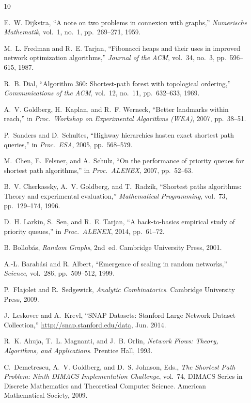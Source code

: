 \documentclass[conference]{IEEEtran}
\begin{document}

\begin{thebibliography}{10}

E.~W. Dijkstra,
``A note on two problems in connexion with graphs,''
\emph{Numerische Mathematik}, vol.~1, no.~1, pp.~269--271, 1959.

M.~L. Fredman and R.~E. Tarjan,
``Fibonacci heaps and their uses in improved network optimization
algorithms,''
\emph{Journal of the ACM}, vol.~34, no.~3, pp.~596--615, 1987.

R.~B. Dial,
``Algorithm 360: Shortest-path forest with topological ordering,''
\emph{Communications of the ACM}, vol.~12, no.~11, pp.~632--633, 1969.

A.~V. Goldberg, H.~Kaplan, and R.~F. Werneck,
``Better landmarks within reach,''
in \emph{Proc.\ Workshop on Experimental Algorithms (WEA)}, 2007,
pp.~38--51.

P.~Sanders and D.~Schultes,
``Highway hierarchies hasten exact shortest path queries,''
in \emph{Proc.\ ESA}, 2005, pp.~568--579.

M.~Chen, E.~Felsner, and A.~Schulz,
``On the performance of priority queues for shortest path algorithms,''
in \emph{Proc.\ ALENEX}, 2007, pp.~52--63.

B.~V. Cherkassky, A.~V. Goldberg, and T.~Radzik,
``Shortest paths algorithms: Theory and experimental evaluation,''
\emph{Mathematical Programming}, vol.~73, pp.~129--174, 1996.

D.~H. Larkin, S.~Sen, and R.~E. Tarjan,
``A back-to-basics empirical study of priority queues,''
in \emph{Proc.\ ALENEX}, 2014, pp.~61--72.

B. Bollob\'as,
\emph{Random Graphs}, 2nd~ed.
Cambridge University Press, 2001.

A.-L. Barab\'asi and R. Albert,
``Emergence of scaling in random networks,''
\emph{Science}, vol.~286, pp.~509--512, 1999.

P.~Flajolet and R.~Sedgewick,
\emph{Analytic Combinatorics}.
Cambridge University Press, 2009.

J.~Leskovec and A.~Krevl,
``{SNAP Datasets}: {Stanford} Large Network Dataset Collection,''
\url{http://snap.stanford.edu/data}, Jun. 2014.

R.~K. Ahuja, T.~L. Magnanti, and J.~B. Orlin,
\emph{Network Flows: Theory, Algorithms, and Applications}.
Prentice Hall, 1993.

C.~Demetrescu, A.~V. Goldberg, and D.~S. Johnson, Eds.,
\emph{The Shortest Path Problem: Ninth DIMACS Implementation Challenge},
vol.~74, DIMACS Series in Discrete Mathematics and Theoretical Computer
Science.  American Mathematical Society, 2009.

\end{thebibliography}
\end{document}
